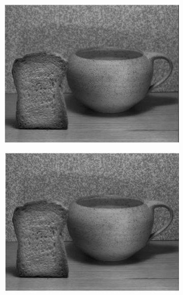 \begin{figure}[h]
	\centering
	\begin{subfigure}{.3\textwidth}
		\centering
		\includegraphics[width=\linewidth]{Figures/SOA/fav1.png}
	\end{subfigure}
	\begin{subfigure}{.3\textwidth}
		
		\centering
		\includegraphics[width=\linewidth]{Figures/SOA/fav2.png}
	\end{subfigure}
	\begin{subfigure}{.3\textwidth}
		

\end{subfigure}
\end{figure}
